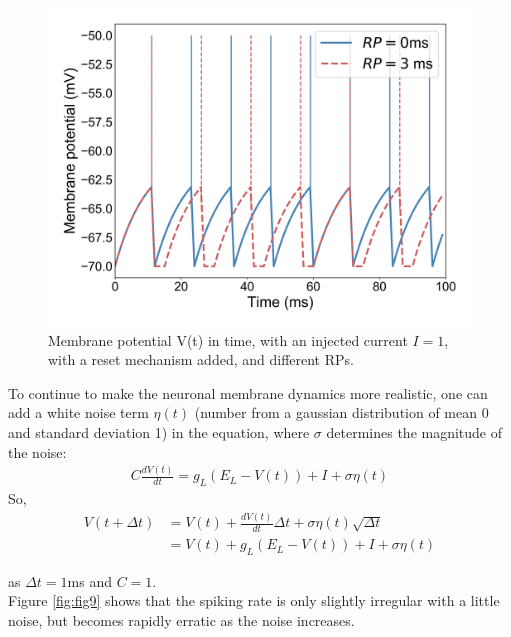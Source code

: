 \documentclass{article}
\begin{document}
\begin{figure}[H]
\centering
\includegraphics[width=.8\linewidth]{report3_fig11.png}
\caption[growing population]{Membrane potential V(t) in time, with an injected current $I=1$, with a reset mechanism added, and different RPs.}\label{fig:fig8}
\end{figure}

To continue to make the neuronal membrane dynamics more realistic, one can add a white noise term $\eta(t)$ (number from a gaussian distribution of mean 0 and standard deviation 1) in the equation, where $\sigma$ determines the magnitude of the noise:
\begin{align*}
  C\frac{dV(t)}{dt} = g_L(E_L - V(t)) + I + \sigma\eta(t)
\end{align*}
So,
\begin{align*}
  V(t+\Delta t) &= V(t) + \frac{dV(t)}{dt} \Delta t + \sigma\eta(t)\sqrt{\Delta t}\\
                &= V(t) + g_L(E_L - V(t)) + I + \sigma\eta(t)
\end{align*}

\noindent as $\Delta t = 1$ms and $C=1$.\\

Figure \ref{fig:fig9} shows that the spiking rate is only slightly irregular with a little noise, but becomes rapidly erratic as the noise increases.
\end{document}
